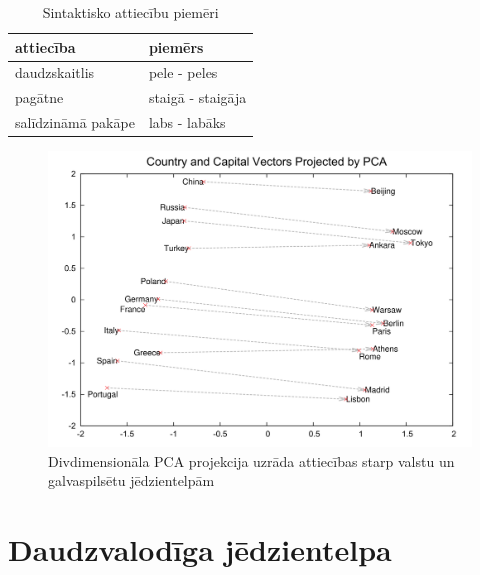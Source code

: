 \begin{table}[htbp]
	\centering
	\caption{Sintaktisko attiecību piemēri \cite{word2vec2013}}
	\begin{tabular}{ll}\toprule
		attiecība & piemērs  \\\midrule
		daudzskaitlis   & pele - peles \\
		pagātne   & staigā - staigāja \\
		salīdzināmā pakāpe   & labs - labāks \\\bottomrule
	\end{tabular}%
	\label{tab:sintactic-relationship-examples}%
\end{table}


\begin{figure}[h]
	\centering
	\includegraphics[width=\textwidth]{figures/word2vec-country-capital.png}
	\caption{Divdimensionāla PCA projekcija uzrāda attiecības starp valstu un galvaspilsētu jēdzientelpām \cite{colyer2016}}
	\label{fig:country-capital}%
\end{figure}



\section{Daudzvalodīga jēdzientelpa}
